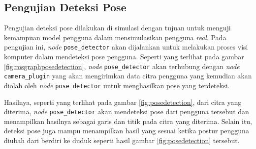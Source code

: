\subsection{Pengujian Deteksi Pose}
\label{subsec:posedetectiontesting}



Pengujian deteksi pose dilakukan di simulasi dengan tujuan untuk menguji kemampuan model pengguna dalam mensimulasikan pengguna \emph{real}.
Pada pengujian ini,
  \emph{node} \lstinline{pose_detector} akan dijalankan untuk melakukan proses visi komputer dalam mendeteksi pose pengguna.
Seperti yang terlihat pada gambar \ref{fig:rosgraphposedetection},
  \emph{node} \lstinline{pose_detector} akan terhubung dengan \emph{node} \lstinline{camera_plugin} yang akan mengirimkan data citra pengguna yang kemudian akan diolah oleh \emph{node} \lstinline{pose detector} untuk menghasilkan pose yang terdeteksi.



Hasilnya,
  seperti yang terlihat pada gambar \ref{fig:posedetection},
  dari citra yang diterima,
  \emph{node} \lstinline{pose_detector} akan mendeteksi pose dari pengguna tersebut dan menampilkan hasilnya sebagai garis dan titik pada citra yang diterima.
Selain itu,
  deteksi pose juga mampu menampilkan hasil yang sesuai ketika postur pengguna diubah dari berdiri ke duduk seperti hasil gambar \ref{fig:posedetection} tersebut.

